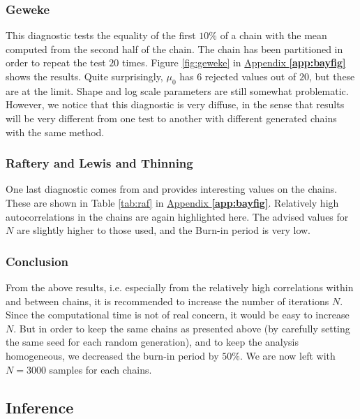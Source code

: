 \subsubsection*{Geweke}

This diagnostic tests the equality of the first $10\%$ of a chain with the mean computed from the second half of the chain. The chain has been partitioned in order to repeat the test $20$ times.
Figure \ref{fig:geweke} in \hyperref[app:bayfig]{Appendix \textbf{\ref{app:bayfig}}} shows the results. Quite surprisingly, $\mu_0$ has $6$ rejected values out of $20$, but these are at the limit. Shape and log scale parameters are still somewhat problematic. However, we notice that this diagnostic is very diffuse, in the sense that results will be very different from one test to another with different generated chains with the same method.


\subsubsection*{Raftery and Lewis and Thinning}

One last diagnostic comes from \citet{raftery1992} and provides interesting values on the chains. These are shown in Table \ref{tab:raf} in \hyperref[app:bayfig]{Appendix \textbf{\ref{app:bayfig}}}.
Relatively high autocorrelations in the chains are again highlighted here. The advised values for $N$ are slightly higher to those used, and the Burn-in period is very low.  



\subsubsection*{Conclusion}

From the above results, i.e. especially from the relatively high correlations within and between chains, it is recommended to increase the number of iterations $N$. Since the computational time is not of real concern, it would be easy to increase $N$. But in order to keep the same chains as presented above (by carefully setting the same seed for each random generation), and to keep the analysis homogeneous, we decreased the burn-in period by $50\%$. We are now left with $N=3000$ samples for each chains. 


\subsection{Inference}\label{sec:bayinfci}

